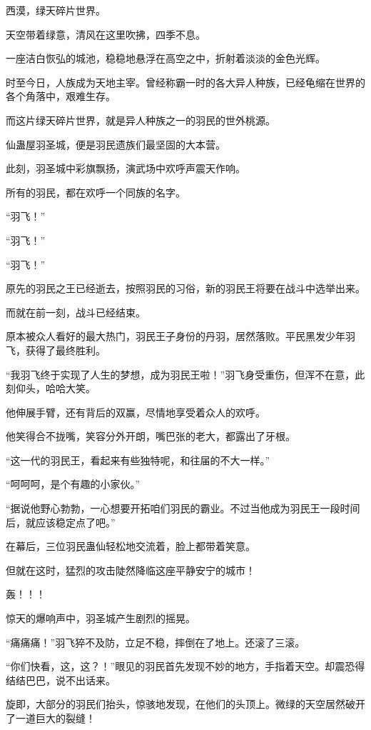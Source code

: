
\begin{this_body}

西漠，绿天碎片世界。

天空带着绿意，清风在这里吹拂，四季不息。

一座洁白恢弘的城池，稳稳地悬浮在高空之中，折射着淡淡的金色光辉。

时至今日，人族成为天地主宰。曾经称霸一时的各大异人种族，已经龟缩在世界的各个角落中，艰难生存。

而这片绿天碎片世界，就是异人种族之一的羽民的世外桃源。

仙蛊屋羽圣城，便是羽民遗族们最坚固的大本营。

此刻，羽圣城中彩旗飘扬，演武场中欢呼声震天作响。

所有的羽民，都在欢呼一个同族的名字。

“羽飞！”

“羽飞！”

“羽飞！”

原先的羽民之王已经逝去，按照羽民的习俗，新的羽民王将要在战斗中选举出来。

而就在前一刻，战斗已经结束。

原本被众人看好的最大热门，羽民王子身份的丹羽，居然落败。平民黑发少年羽飞，获得了最终胜利。

“我羽飞终于实现了人生的梦想，成为羽民王啦！”羽飞身受重伤，但浑不在意，此刻仰头，哈哈大笑。

他伸展手臂，还有背后的双赢，尽情地享受着众人的欢呼。

他笑得合不拢嘴，笑容分外开朗，嘴巴张的老大，都露出了牙根。

“这一代的羽民王，看起来有些独特呢，和往届的不大一样。”

“呵呵呵，是个有趣的小家伙。”

“据说他野心勃勃，一心想要开拓咱们羽民的霸业。不过当他成为羽民王一段时间后，就应该稳定点了吧。”

在幕后，三位羽民蛊仙轻松地交流着，脸上都带着笑意。

但就在这时，猛烈的攻击陡然降临这座平静安宁的城市！

轰！！！

惊天的爆响声中，羽圣城产生剧烈的摇晃。

“痛痛痛！”羽飞猝不及防，立足不稳，摔倒在了地上。还滚了三滚。

“你们快看，这，这？！”眼见的羽民首先发现不妙的地方，手指着天空。却震恐得结结巴巴，说不出话来。

旋即，大部分的羽民们抬头，惊骇地发现，在他们的头顶上。微绿的天空居然破开了一道巨大的裂缝！


\end{this_body}
